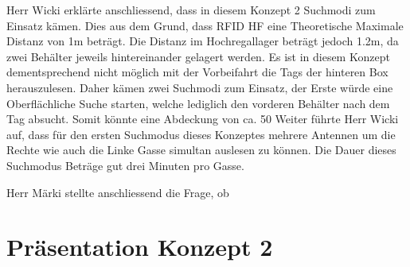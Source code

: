 \documentclass[a4paper]{scrreprt}
\begin{document}
Herr Wicki erklärte anschliessend, dass in diesem Konzept 2 Suchmodi zum Einsatz kämen. Dies aus dem Grund, dass RFID HF eine Theoretische Maximale Distanz von 1m beträgt. Die Distanz im Hochregallager beträgt jedoch 1.2m, da zwei Behälter jeweils hintereinander gelagert werden. Es ist in diesem Konzept dementsprechend nicht möglich mit der Vorbeifahrt die Tags der hinteren Box herauszulesen. Daher kämen zwei Suchmodi zum Einsatz, der Erste würde eine Oberflächliche Suche starten, welche lediglich den vorderen Behälter nach dem Tag absucht. Somit könnte eine Abdeckung von ca. 50%
Weiter führte Herr Wicki auf, dass für den ersten Suchmodus dieses Konzeptes mehrere Antennen um die Rechte wie auch die Linke Gasse simultan auslesen zu können. Die Dauer dieses Suchmodus Beträge gut drei Minuten pro Gasse. 

Herr Märki stellte anschliessend die Frage, ob  

\chapter{Präsentation Konzept 2}
\end{document}
